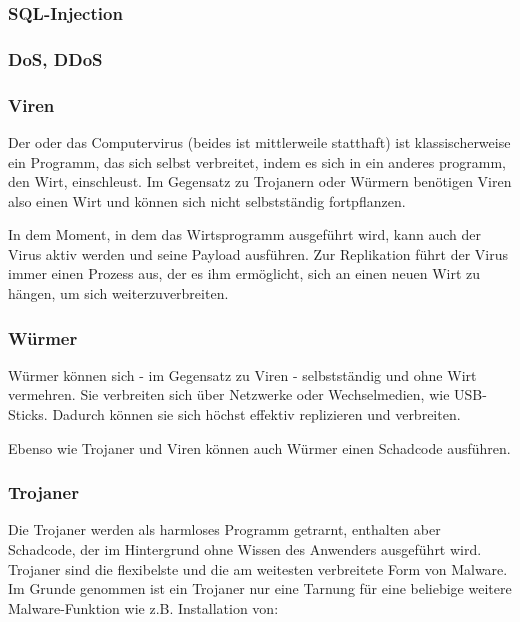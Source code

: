 \subsubsection{SQL-Injection}

\subsubsection{DoS, DDoS}
\label{sec:DoSDDoS}


\subsubsection{Viren}
\label{sec:Viren}

Der oder das Computervirus (beides ist mittlerweile statthaft) ist klassischerweise ein Programm, das sich selbst verbreitet, indem es sich in ein anderes programm, den Wirt, einschleust. Im Gegensatz zu Trojanern oder Würmern benötigen Viren also einen Wirt und können sich nicht selbstständig fortpflanzen.

In dem Moment, in dem das Wirtsprogramm ausgeführt wird, kann auch der Virus aktiv werden und seine Payload ausführen. Zur Replikation führt der Virus immer einen Prozess aus, der es ihm ermöglicht, sich an einen neuen Wirt zu hängen, um sich weiterzuverbreiten.

\subsubsection{Würmer}
\label{sec:Wuermer}

Würmer können sich - im Gegensatz zu Viren - selbstständig und ohne Wirt vermehren. Sie verbreiten sich über Netzwerke oder Wechselmedien, wie USB-Sticks. Dadurch können sie sich höchst effektiv replizieren und verbreiten.

Ebenso wie Trojaner und Viren können auch Würmer einen Schadcode ausführen.

\subsubsection{Trojaner}
\label{sec:Trojaner}

Die Trojaner werden als harmloses Programm getrarnt, enthalten aber Schadcode, der im Hintergrund ohne Wissen des Anwenders ausgeführt wird. Trojaner sind die flexibelste und die am weitesten verbreitete Form von Malware. Im Grunde genommen ist ein Trojaner nur eine Tarnung für eine beliebige weitere Malware-Funktion wie z.B. Installation von:

